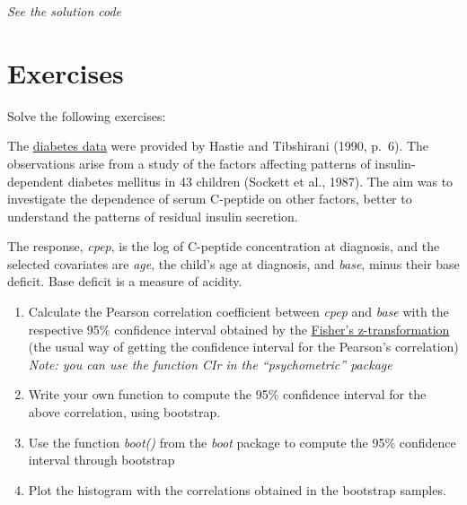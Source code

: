 \documentclass[
]{book}
\newenvironment{Shaded}{\begin{snugshade}}{\end{snugshade}}
\newcommand{\AttributeTok}[1]{\textcolor[rgb]{0.13,0.29,0.53}{#1}}
\newcommand{\CommentTok}[1]{\textcolor[rgb]{0.56,0.35,0.01}{\textit{#1}}}
\newcommand{\ControlFlowTok}[1]{\textcolor[rgb]{0.13,0.29,0.53}{\textbf{#1}}}
\newcommand{\DecValTok}[1]{\textcolor[rgb]{0.00,0.00,0.81}{#1}}
\newcommand{\FunctionTok}[1]{\textcolor[rgb]{0.13,0.29,0.53}{\textbf{#1}}}
\newcommand{\NormalTok}[1]{#1}
\newcommand{\OtherTok}[1]{\textcolor[rgb]{0.56,0.35,0.01}{#1}}
\newcommand{\SpecialCharTok}[1]{\textcolor[rgb]{0.81,0.36,0.00}{\textbf{#1}}}
\newcommand{\StringTok}[1]{\textcolor[rgb]{0.31,0.60,0.02}{#1}}
\begin{document}
\emph{See the solution code}

\begin{Shaded}
\end{Shaded}

\section{Exercises}\label{boot.exerc}

Solve the following exercises:

The \href{https://www.dropbox.com/s/4t7nph5d97hq0qh/diabetes.csv?dl=1}{diabetes data}
were provided by Hastie and Tibshirani (1990, p.~6).
The observations arise from a study of the factors affecting patterns of
insulin-dependent diabetes mellitus in 43 children (Sockett et al., 1987).
The aim was to investigate the dependence of serum C-peptide on other factors,
better to understand the patterns of residual insulin secretion.

The response, \emph{cpep}, is the log of C-peptide concentration at diagnosis, and
the selected covariates are \emph{age}, the child's age at diagnosis, and \emph{base},
minus their base deficit. Base deficit is a measure of acidity.

\begin{enumerate}
\def\labelenumi{\arabic{enumi})}
\item
  Calculate the Pearson correlation coefficient between \emph{cpep} and \emph{base} with
  the respective 95\% confidence interval obtained by the \href{https://en.wikipedia.org/wiki/Fisher_transformation}{Fisher's
  z-transformation} (the
  usual way of getting the confidence interval for the Pearson's correlation)\\
  \emph{Note: you can use the function CIr in the ``psychometric'' package}
\item
  Write your own function to compute the 95\% confidence interval
  for the above correlation, using bootstrap.
\item
  Use the function \emph{boot()} from the \emph{boot} package to compute
  the 95\% confidence interval through bootstrap
\item
  Plot the histogram with the correlations obtained in
  the bootstrap samples.
\end{enumerate}
\end{document}
